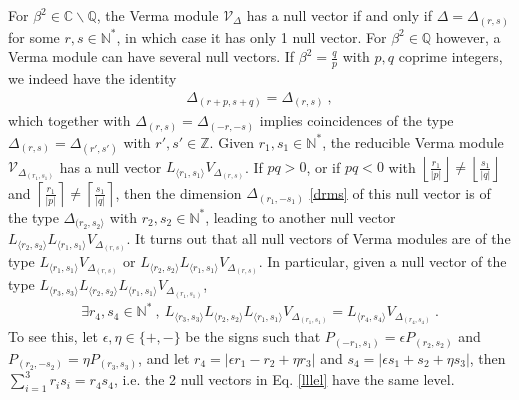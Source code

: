 \documentclass[12pt, a4paper]{article}
\begin{document}
For $\beta^2\in\mathbb{C}\backslash \mathbb{Q}$, the Verma module $\mathcal{V}_\Delta$ has a null vector if and only if $\Delta=\Delta_{(r, s)}$ for some $r,s\in\mathbb{N}^*$, in which case it has only 1 null vector. For $\beta^2\in\mathbb{Q}$ however, a Verma module can have several null vectors. If $\beta^2 = \frac{q}{p}$ with $p,q$ coprime integers, we indeed have the identity
\begin{align}
 \Delta_{(r+p,s+q)} = \Delta_{(r,s)}\ ,
 \label{rpsq}
\end{align}
which together with $\Delta_{(r,s)}=\Delta_{(-r,-s)}$ implies coincidences of the type $\Delta_{(r,s)}=\Delta_{(r',s')}$ with $r',s'\in\mathbb{Z}$. 
Given $r_1,s_1\in \mathbb{N}^*$, the reducible Verma module $\mathcal{V}_{\Delta_{(r_1,s_1)}}$ has a null vector $L_{\langle r_1,s_1\rangle} V_{\Delta_{(r,s)}}$. If $pq>0$, or if $pq<0$ with $\left\lfloor \frac{r_1}{|p|}\right\rfloor \neq \left\lfloor \frac{s_1}{|q|}\right\rfloor$ and $\left\lceil \frac{r_1}{|p|}\right\rceil \neq \left\lceil \frac{s_1}{|q|}\right\rceil$, then the dimension $\Delta_{(r_1,-s_1)}$ \eqref{drms} of this null vector is of the type $\Delta_{(r_2,s_2\rangle}$ with $r_2,s_2\in\mathbb{N}^*$, leading to another null vector $L_{\langle r_2,s_2\rangle}L_{\langle r_1,s_1\rangle} V_{\Delta_{(r,s)}}$. 
It turns out that all null vectors of Verma modules are of the type $L_{\langle r_1,s_1\rangle} V_{\Delta_{(r,s)}}$ or $L_{\langle r_2,s_2\rangle}L_{\langle r_1,s_1\rangle} V_{\Delta_{(r,s)}}$. In particular, given a null vector of the type $L_{\langle r_3,s_3\rangle}L_{\langle r_2,s_2\rangle}L_{\langle r_1,s_1\rangle} V_{\Delta_{(r_1,s_1)}}$, 
\begin{align}
 \exists r_4,s_4\in \mathbb{N}^*\ , \ L_{\langle r_3,s_3\rangle}L_{\langle r_2,s_2\rangle}L_{\langle r_1,s_1\rangle} V_{\Delta_{(r_1,s_1)}} = L_{\langle r_4,s_4\rangle} V_{\Delta_{(r_4,s_4)}}\ .
 \label{lllel}
\end{align}
To see this, let $\epsilon,\eta\in\{+,-\}$ be the signs such that $P_{(-r_1,s_1)}=\epsilon P_{(r_2,s_2)}$ and $P_{(r_2,-s_2)}=\eta P_{(r_3,s_3)}$, and let $r_4=|\epsilon r_1-r_2+\eta r_3|$ and $s_4=|\epsilon s_1+s_2+\eta s_3|$, then $\sum_{i=1}^3 r_is_i=r_4s_4$, i.e. the 2 null vectors in Eq. \eqref{lllel} have the same level. 
\end{document}
